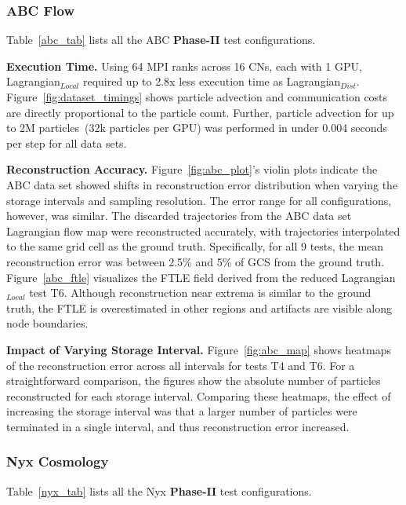 \subsubsection{ABC Flow}
\label{sec:abc}

Table~\ref{abc_tab} lists all the ABC \textbf{Phase-II} test configurations.
%



\textbf{Execution Time.} Using 64 MPI ranks across 16 CNs, each with 1 GPU, Lagrangian$_{Local}$ required up to 2.8x less execution time as Lagrangian$_{Dist}$.
%
Figure~\ref{fig:dataset_timings} shows particle advection and communication costs are directly proportional to the particle count.
%
Further, particle advection for up to 2M particles~(32k particles per GPU) was performed in under 0.004 seconds per step for all data sets.
%


\textbf{Reconstruction Accuracy.} Figure~\ref{fig:abc_plot}'s violin plots indicate the ABC data set showed shifts in reconstruction error distribution when varying the storage intervals and sampling resolution. 
%
The error range for all configurations, however, was similar.
%
The discarded trajectories from the ABC data set Lagrangian flow map were reconstructed accurately, with trajectories interpolated to the same grid cell as the ground truth.
%
Specifically, for all 9 tests, the mean reconstruction error was between 2.5\% and 5\% of GCS from the ground truth.
%
{Figure~\ref{abc_ftle} visualizes the FTLE field derived from the reduced Lagrangian$_{Local}$ test T6. 
%
Although reconstruction near extrema is similar to the ground truth, the FTLE is overestimated in other regions and artifacts are visible along node boundaries.}


\textbf{Impact of Varying Storage Interval.} Figure~\ref{fig:abc_map} shows heatmaps of the reconstruction error across all intervals for tests T4 and T6.
%
For a straightforward comparison, the figures show the absolute number of particles reconstructed for each storage interval.
%
Comparing these heatmaps, the effect of increasing the storage interval was that a larger number of particles were terminated in a single interval, and thus reconstruction error increased. 
%

\vspace{-2mm}
\subsubsection{Nyx Cosmology}
\label{sec:nyx}
Table~\ref{nyx_tab} lists all the Nyx \textbf{Phase-II} test configurations. 
%


